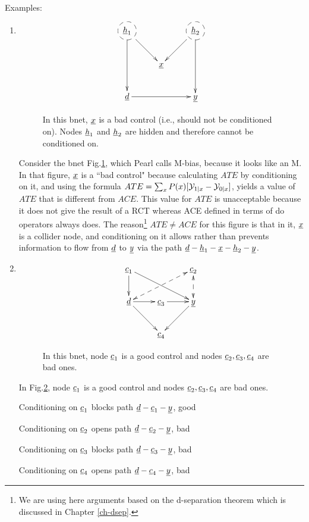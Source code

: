 Examples:

\begin{enumerate}
\item
\begin{figure}[h!]
$$
\xymatrix{
*++[F-o]{\rvh_1} \ar[dd]\ar[dr]
&
& *++[F-o]{\rvh_2}  \ar[dd]\ar[dl]
\\
& \rvx
\\
\rvd \ar[rr]
&&\rvy
}$$
\caption{In this bnet,
${\underline{x}}$ is a bad control
(i.e., should
not be conditioned on).
Nodes ${\underline{h}}_1$
and ${\underline{h}}_2$ are 
hidden and therefore
cannot be conditioned on.}
\label{fig-po-m-bias}
\end{figure}

Consider the 
bnet Fig.\ref{fig-po-m-bias},
which  Pearl calls M-bias,
because it looks like an M.
In that figure, 
${\underline{x}}$
is a ``bad control"
because 
calculating
$ATE$ by conditioning on it,
and using the formula
$ATE=\sum_x
 P(x)[{\cal Y}_{1|x}-{\cal Y}_{0|x}]$,
yields a value of $ATE$
that is different from
$ACE$. This value for $ATE$
is unacceptable
because it does 
not give the result of a RCT
whereas ACE defined
in terms of do operators 
always does.
The reason\footnote{We are
using here arguments 
based on the d-separation 
theorem 
which is discussed in Chapter 
\ref{ch-dsep}.} $ATE\neq ACE$
for this figure
is that in it,
${\underline{x}}$ is 
a collider node,
and conditioning 
on it allows
rather than
prevents information
to flow from ${\underline{d}}$
to ${\underline{y}}$
via the path 
${\underline{d}}-{\underline{h}}_1-{\underline{x}}-{\underline{h}}_2-{\underline{y}}$.
\item

\begin{figure}[h!]
$$
\xymatrix{
\rvc_1\ar[d]\ar[drr]
&&\rvc_2\ar@{<-->}[d]
\ar@{<-->}[dll]
\\
\rvd\ar[r]\ar[dr]
&\rvc_3\ar[r]
&\rvy\ar[dl]
\\
&\rvc_4
}$$
\caption{In this bnet,
node ${\underline{c}}_1$ is a good
control and nodes ${\underline{c}}_2, {\underline{c}}_3, {\underline{c}}_4$
are bad ones.}
\label{fig-po-1-good-3-bad}
\end{figure}

In Fig.\ref{fig-po-1-good-3-bad}, node
${\underline{c}}_1$ is a good
control and nodes ${\underline{c}}_2, {\underline{c}}_3, {\underline{c}}_4$
are bad ones.

Conditioning on ${\underline{c}}_1$ blocks path ${\underline{d}}-{\underline{c}}_1-{\underline{y}}$, good

Conditioning on ${\underline{c}}_2$ opens path ${\underline{d}}-{\underline{c}}_2-{\underline{y}}$, bad

Conditioning on ${\underline{c}}_3$ blocks path ${\underline{d}}-{\underline{c}}_3-{\underline{y}}$, bad

Conditioning on ${\underline{c}}_4$ opens path ${\underline{d}}-{\underline{c}}_4-{\underline{y}}$, bad



\end{enumerate}





